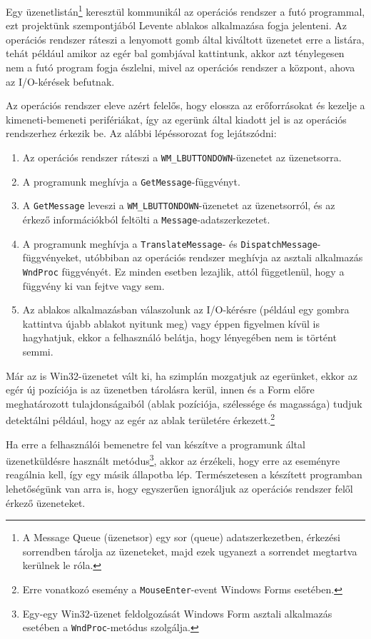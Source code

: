 \documentclass[tocnopagenum]{thesis-ekf}
\begin{document}
	Egy üzenetlistán\footnote{A Message Queue (üzenetsor) egy sor (queue) adatszerkezetben, érkezési sorrendben tárolja az üzeneteket, majd ezek ugyanezt a sorrendet megtartva kerülnek le róla.} keresztül kommunikál az operációs rendszer a futó programmal, ezt projektünk szempontjából Levente ablakos alkalmazása fogja jelenteni. Az operációs rendszer ráteszi a lenyomott gomb által kiváltott üzenetet erre a listára, tehát például amikor az egér bal gombjával kattintunk, akkor azt ténylegesen nem a futó program fogja észlelni, mivel az operációs rendszer a központ, ahova az I/O-kérések befutnak. 
	
	Az operációs rendszer eleve azért felelős, hogy elossza az erőforrásokat és kezelje a kimeneti-bemeneti perifériákat, így az egerünk által kiadott jel is az operációs rendszerhez érkezik be.
	Az alábbi lépéssorozat fog lejátszódni:
	\begin{enumerate}
		\item Az operációs rendszer ráteszi a \verb*|WM_LBUTTONDOWN|-üzenetet az üzenetsorra.
		\item A programunk meghívja a \verb*|GetMessage|-függvényt.
		\item A \verb*|GetMessage| leveszi a \verb*|WM_LBUTTONDOWN|-üzenetet az üzenetsorról, és az érkező információkból feltölti a \verb*|Message|-adatszerkezetet.
		\item A programunk meghívja a \verb*|TranslateMessage|- és \verb*|DispatchMessage|-függvényeket, utóbbiban az operációs rendszer meghívja az asztali alkalmazás \verb*|WndProc| függvényét. Ez minden esetben lezajlik, attól függetlenül, hogy a függvény ki van fejtve vagy sem.
		\item Az ablakos alkalmazásban válaszolunk az I/O-kérésre (például egy gombra kattintva újabb ablakot nyitunk meg) vagy éppen figyelmen kívül is hagyhatjuk, ekkor a felhasználó belátja, hogy lényegében nem is történt semmi.
	\end{enumerate}
	
	Már az is Win32-üzenetet vált ki, ha szimplán mozgatjuk az egerünket, ekkor az egér új pozíciója is az üzenetben tárolásra kerül, innen és a Form előre meghatározott tulajdonságaiból (ablak pozíciója, szélessége és magassága) tudjuk detektálni például, hogy az egér az ablak területére érkezett.\footnote{Erre vonatkozó esemény a \verb*|MouseEnter|-event Windows Forms esetében.}
	
	Ha erre a felhasználói bemenetre fel van készítve a programunk által üzenetküldésre használt metódus\footnote{Egy-egy Win32-üzenet feldolgozását Windows Form asztali alkalmazás esetében a \verb*|WndProc|-metódus szolgálja.}, akkor az érzékeli, hogy erre az eseményre reagálnia kell, így egy másik állapotba lép. Természetesen a készített programban lehetőségünk van arra is, hogy egyszerűen ignoráljuk az operációs rendszer felől érkező üzeneteket.
	
\end{document}
